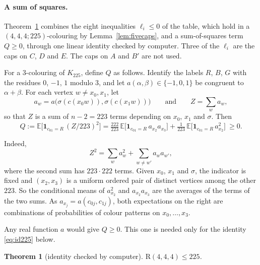 \documentclass[11pt]{article}
\theoremstyle{spacedplain}
\newtheorem{theorem}{Theorem}[section]
\theoremstyle{spaceddef}
\theoremstyle{spacedremark}
\newcommand{\R}{\mathrm{R}}
\begin{document}
\paragraph{A sum of squares.}
Theorem~\ref{thm:444b} combines the eight inequalities $\ell_i\le 0$ of the table, which hold in a $(4,4,4;225)$-colouring by Lemma~\ref{lem:fivecaps}, and a sum-of-squares term $Q\ge 0$, through one linear identity checked by computer.
Three of the $\ell_i$ are the caps on $C$, $D$ and $E$.
The caps on $A$ and $B'$ are not used.

For a $3$-colouring of $K_{225}$, define $Q$ as follows.
Identify the labels $R$, $B$, $G$ with the residues $0$, $-1$, $1$ modulo $3$, and let $a(\alpha,\beta)\in\{-1,0,1\}$ be congruent to $\alpha+\beta$.
For each vertex $w\ne x_0,x_1$, let
\[
a_w=a\big(\sigma(c(x_0w)),\sigma(c(x_1w))\big)\qquad\text{and}\qquad Z=\sum_wa_w,
\]
so that $Z$ is a sum of $n-2=223$ terms depending on $x_0$, $x_1$ and $\sigma$.
Then
\[
Q:=\mathbb E\big[\mathbf 1_{c_{01}=R}\,(Z/223)^2\big]=\tfrac{222}{223}\,\mathbb E\big[\mathbf 1_{c_{01}=R}\,a_{x_2}a_{x_3}\big]+\tfrac1{223}\,\mathbb E\big[\mathbf 1_{c_{01}=R}\,a_{x_2}^2\big]\ \ge 0 .
\]

Indeed,
\[
Z^2=\sum_wa_w^2+\sum_{w\ne w'}a_wa_{w'},
\]
where the second sum has $223\cdot 222$ terms.
Given $x_0$, $x_1$ and $\sigma$, the indicator is fixed and $(x_2,x_3)$ is a uniform ordered pair of distinct vertices among the other $223$.
So the conditional means of $a_{x_2}^2$ and $a_{x_2}a_{x_3}$ are the averages of the terms of the two sums.
As $a_{x_j}=a(c_{0j},c_{1j})$, both expectations on the right are combinations of probabilities of colour patterns on $x_0,\dots,x_3$.

Any real function $a$ would give $Q\ge 0$.
This one is needed only for the identity \eqref{eq:id225} below.

\begin{theorem}[identity checked by computer]\label{thm:444b}
$\R(4,4,4)\le 225$.
\end{theorem}
\end{document}
